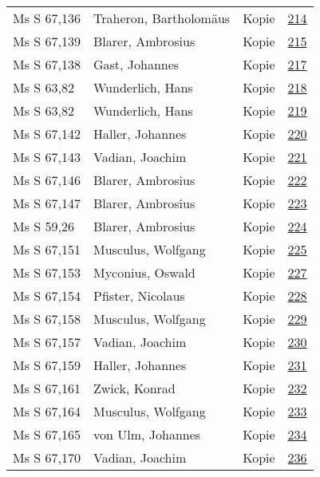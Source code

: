 \documentclass[10pt,a4paper,landscape]{report}
\begin{document}
\begin{longtable}{p{16cm}p{4cm}lr}
Ms S 67,136	&	Traheron, Bartholomäus	&	Kopie	&	\href{http://130.60.24.72/assignment/214}{214}\\
Ms S 67,139	&	Blarer, Ambrosius	&	Kopie	&	\href{http://130.60.24.72/assignment/215}{215}\\
Ms S 67,138	&	Gast, Johannes	&	Kopie	&	\href{http://130.60.24.72/assignment/217}{217}\\
Ms S 63,82	&	Wunderlich, Hans	&	Kopie	&	\href{http://130.60.24.72/assignment/218}{218}\\
Ms S 63,82	&	Wunderlich, Hans	&	Kopie	&	\href{http://130.60.24.72/assignment/219}{219}\\
Ms S 67,142	&	Haller, Johannes	&	Kopie	&	\href{http://130.60.24.72/assignment/220}{220}\\
Ms S 67,143	&	Vadian, Joachim	&	Kopie	&	\href{http://130.60.24.72/assignment/221}{221}\\
Ms S 67,146	&	Blarer, Ambrosius	&	Kopie	&	\href{http://130.60.24.72/assignment/222}{222}\\
Ms S 67,147	&	Blarer, Ambrosius	&	Kopie	&	\href{http://130.60.24.72/assignment/223}{223}\\
Ms S 59,26	&	Blarer, Ambrosius	&	Kopie	&	\href{http://130.60.24.72/assignment/224}{224}\\
Ms S 67,151	&	Musculus, Wolfgang	&	Kopie	&	\href{http://130.60.24.72/assignment/225}{225}\\
Ms S 67,153	&	Myconius, Oswald	&	Kopie	&	\href{http://130.60.24.72/assignment/227}{227}\\
Ms S 67,154	&	Pfister, Nicolaus	&	Kopie	&	\href{http://130.60.24.72/assignment/228}{228}\\
Ms S 67,158	&	Musculus, Wolfgang	&	Kopie	&	\href{http://130.60.24.72/assignment/229}{229}\\
Ms S 67,157	&	Vadian, Joachim	&	Kopie	&	\href{http://130.60.24.72/assignment/230}{230}\\
Ms S 67,159	&	Haller, Johannes	&	Kopie	&	\href{http://130.60.24.72/assignment/231}{231}\\
Ms S 67,161	&	Zwick, Konrad	&	Kopie	&	\href{http://130.60.24.72/assignment/232}{232}\\
Ms S 67,164	&	Musculus, Wolfgang	&	Kopie	&	\href{http://130.60.24.72/assignment/233}{233}\\
Ms S 67,165	&	von Ulm, Johannes	&	Kopie	&	\href{http://130.60.24.72/assignment/234}{234}\\
Ms S 67,170	&	Vadian, Joachim	&	Kopie	&	\href{http://130.60.24.72/assignment/236}{236}\\

\end{longtable}
\end{document}
